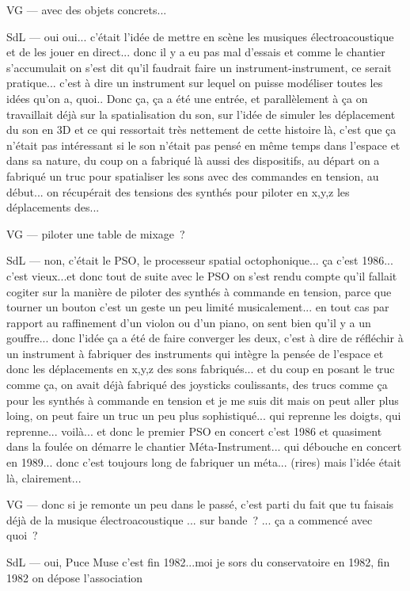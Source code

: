 VG — avec des objets concrets... 

SdL — oui oui... c'était l'idée de mettre en scène les musiques électroacoustique et de les jouer en direct... donc il y a eu pas mal d'essais et comme le chantier s'accumulait on s'est dit qu'il faudrait faire un instrument-instrument, ce serait pratique... c'est à dire un instrument sur lequel on puisse modéliser toutes les idées qu'on a, quoi.. Donc ça, ça a été une entrée, et parallèlement à ça on travaillait déjà sur la spatialisation du son, sur l'idée de simuler les déplacement du son en 3D et ce qui ressortait très nettement de cette histoire là, c'est que ça n'était pas intéressant si le son n'était pas pensé en même temps dans l'espace et dans sa nature, du coup on a fabriqué là aussi des dispositifs, au départ on a fabriqué un truc pour spatialiser les sons avec des commandes en tension, au début... on récupérait des tensions des synthés pour piloter en x,y,z les déplacements des... 

VG — piloter une table de mixage ? 

SdL — non, c'était le PSO, le processeur spatial octophonique... ça c'est 1986... c'est vieux...et donc tout de suite avec le PSO on s'est rendu compte qu'il fallait cogiter sur la manière de piloter des synthés à commande en tension, parce que tourner un bouton c'est un geste un peu limité musicalement... en tout cas par rapport au raffinement d'un violon ou d'un piano, on sent bien qu'il y a un gouffre... donc l'idée ça a été de faire converger les deux, c'est à dire de réfléchir à un instrument à fabriquer des instruments qui intègre la pensée de l'espace et donc les déplacements en x,y,z des sons fabriqués... et du coup en posant le truc comme ça, on avait déjà fabriqué des joysticks coulissants, des trucs comme ça pour les synthés à commande en tension et je me suis dit mais on peut aller plus loing, on peut faire un truc un peu plus sophistiqué... qui reprenne les doigts, qui reprenne... voilà... et donc le premier PSO en concert c'est 1986 et quasiment dans la foulée on démarre le chantier Méta-Instrument... qui débouche en concert en 1989... donc c'est toujours long de fabriquer un méta... (rires) mais l'idée était là, clairement... 

VG — donc si je remonte un peu dans le passé, c'est parti du fait que tu faisais déjà de la musique électroacoustique ... sur bande ? ... ça a commencé avec quoi ? 

SdL — oui, Puce Muse c'est fin 1982...moi je sors du conservatoire en 1982, fin 1982 on dépose l'association 

